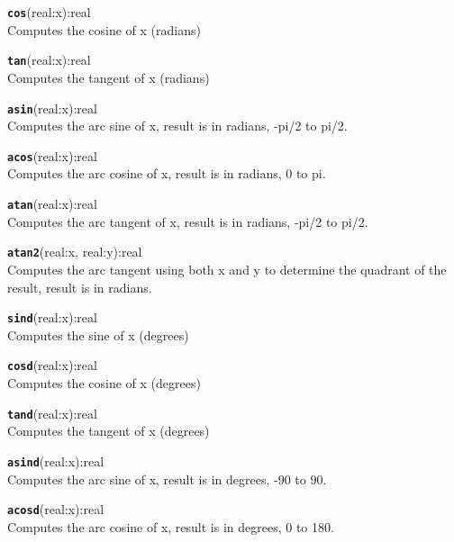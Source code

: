 \hrulefill

\texttt{{\large\textbf{cos}}}\textsf{(real:x):real}\\
 Computes the cosine of x (radians)

\hrulefill

\texttt{{\large\textbf{tan}}}\textsf{(real:x):real}\\
 Computes the tangent of x (radians)

\hrulefill

\texttt{{\large\textbf{asin}}}\textsf{(real:x):real}\\
 Computes the arc sine of x, result is in radians, -pi/2 to pi/2.

\hrulefill

\texttt{{\large\textbf{acos}}}\textsf{(real:x):real}\\
 Computes the arc cosine of x, result is in radians, 0 to pi.

\hrulefill

\texttt{{\large\textbf{atan}}}\textsf{(real:x):real}\\
 Computes the arc tangent of x, result is in radians, -pi/2 to pi/2.

\hrulefill

\texttt{{\large\textbf{atan2}}}\textsf{(real:x, real:y):real}\\
 Computes the arc tangent using both x and y to determine the quadrant of the result, result is in radians.

\hrulefill

\texttt{{\large\textbf{sind}}}\textsf{(real:x):real}\\
 Computes the sine of x (degrees)

\hrulefill

\texttt{{\large\textbf{cosd}}}\textsf{(real:x):real}\\
 Computes the cosine of x (degrees)

\hrulefill

\texttt{{\large\textbf{tand}}}\textsf{(real:x):real}\\
 Computes the tangent of x (degrees)

\hrulefill

\texttt{{\large\textbf{asind}}}\textsf{(real:x):real}\\
 Computes the arc sine of x, result is in degrees, -90 to 90.

\hrulefill

\texttt{{\large\textbf{acosd}}}\textsf{(real:x):real}\\
 Computes the arc cosine of x, result is in degrees, 0 to 180.

